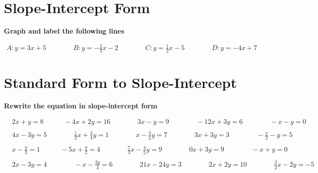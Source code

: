 \documentclass{article}
\begin{document}
\newpage
\section{Slope-Intercept Form}
\bigskip
\textbf{Graph and label the following lines}

\bigskip

\(\begin{aligned}
	A: y=3x+5 \qquad\qquad B: y=-\frac{2}{3}x-2 \qquad\qquad C: y=\frac{1}{2}x-5 \qquad\qquad D: y=-4x+7
\end{aligned}\)
\bigskip


\bigskip

\section{Standard Form to Slope-Intercept}
\bigskip
\textbf{Rewrite the equation in slope-intercept form}
\bigskip

\(\begin{aligned}
	&2x+y=8 \quad\qquad -4x+2y=16 \qquad\qquad 3x-y=9 \qquad\qquad -12x+3y=6 \qquad\qquad -x-y=0\\\\
	&4x-3y=5\qquad\qquad \frac{1}{2}x+\frac{3}{4}y=1 \qquad\qquad x-\frac{3}{5}y=7 \qquad\qquad 3x+3y=3\qquad\qquad -\frac{x}{2}-y=5\\\\
	&x-\frac{y}{3}=1 \quad\qquad -5x+\frac{y}{2}=4 \qquad\qquad \frac{7}{3}x-\frac{4}{5}y=9 \qquad\qquad 0x+3y=9 \qquad\qquad -x+y=0\\\\
	&2x-3y=4 \qquad\qquad -x-\frac{3y}{4}=6 \qquad\qquad 21x-24y=3 \qquad\qquad 2x+2y=10 \qquad\qquad \frac{3}{2}x-2y=-5\\\\
\end{aligned}\)

\newpage

\end{document}

